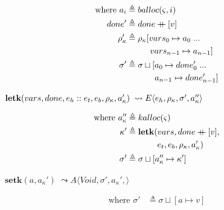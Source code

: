 \documentclass[12pt,draft]{article}
\newcommand\mdoubleplus{\ensuremath{\mathbin{+\mkern-9mu+}}}
\newcommand{\store}[0]{\sigma}
\newcommand{\baddr}[0]{a}
\newcommand{\kaddr}[0]{a_{\kappa}}
\newcommand{\kont}[0]{\kappa}
\newcommand{\state}[0]{\varsigma}
\newcommand{\E}[4]{E\langle #1 , #2 , #3 , #4 \rangle}
\newcommand{\A}[4]{A\langle #1 , #2 , #3 , #4 \rangle}
\begin{document}
\begin{multicols*}{2}
\begin{align*}
  \text{where }
  \baddr_i &\triangleq balloc(\state , i) \\
  done' &\triangleq done \mdoubleplus [v] \\
  \kenv' &\triangleq \kenv[vars_0 \mapsto a_0\;...\\
           &\;\;\;\;\;\;\;\;\;\; vars_{n-1} \mapsto a_{n-1}] \\
  \store' &\triangleq \sigma \sqcup [a_0 \mapsto done'_0\;...\\
           &\;\;\;\;\;\;\;\;\;\;\;\; a_{n-1} \mapsto done'_{n-1}]
\end{align*}
\begin{center}
  $\textbf{letk}(vars, done, e_h::e_t , e_b , \kenv , \kaddr')$
  $\leadsto \E{e_h}{\kenv}{\store'}{\kaddr''}$
\end{center}
\vspace{-7mm}
\begin{align*}
  \text{where }
  \kaddr'' &\triangleq kalloc(\state) \\
  \kont' &\triangleq \textbf{letk}(vars, done \mdoubleplus [v], \\
           &\;\;\;\;\;\;\;\;\;\;\;\;\;e_t , e_b , \kenv , \kaddr') \\
  \store' &\triangleq \store \sqcup [\kaddr'' \mapsto \kont']
\end{align*}
\begin{center}
  $\textbf{setk}(\baddr, \kaddr')$
  $\leadsto \A{\textit{Void}}{\store'}{\kaddr'}{}$
\end{center}
\vspace{-7mm}
\begin{align*}
  \text{where } \store' &\triangleq \store \sqcup [a \mapsto v]
\end{align*}

\vfill\null
\columnbreak



\end{multicols*}
\end{document}
